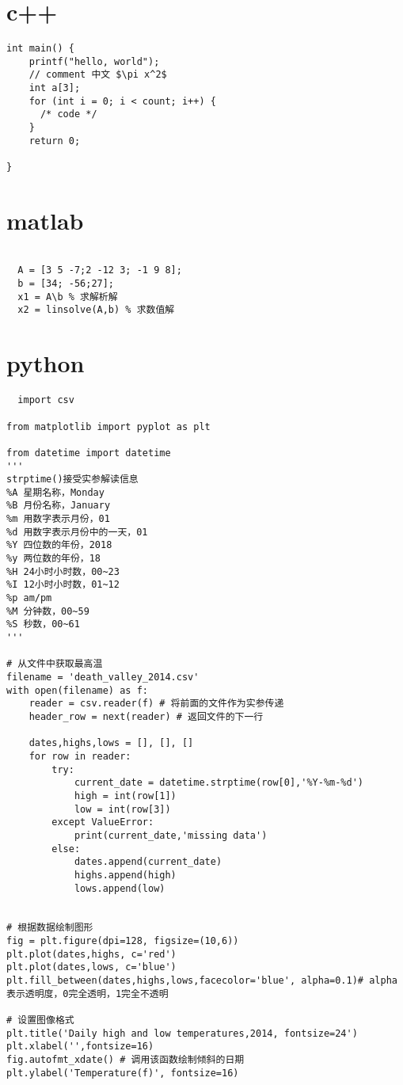\documentclass[UTF8]{ctexart}
\begin{document}
\section{c++}
\begin{verbatim}
int main() {
    printf("hello, world");
    // comment 中文 $\pi x^2$
    int a[3];
    for (int i = 0; i < count; i++) {
      /* code */
    }
    return 0;

}
\end{verbatim}

\section{matlab}
\begin{verbatim}

  A = [3 5 -7;2 -12 3; -1 9 8];
  b = [34; -56;27];
  x1 = A\b % 求解析解
  x2 = linsolve(A,b) % 求数值解
\end{verbatim}




\section{python}

\begin{verbatim}
  import csv

from matplotlib import pyplot as plt

from datetime import datetime
'''
strptime()接受实参解读信息
%A 星期名称，Monday
%B 月份名称，January
%m 用数字表示月份，01
%d 用数字表示月份中的一天，01
%Y 四位数的年份，2018
%y 两位数的年份，18
%H 24小时小时数，00~23
%I 12小时小时数，01~12
%p am/pm
%M 分钟数，00~59
%S 秒数，00~61
'''

# 从文件中获取最高温
filename = 'death_valley_2014.csv'
with open(filename) as f:
    reader = csv.reader(f) # 将前面的文件作为实参传递
    header_row = next(reader) # 返回文件的下一行

    dates,highs,lows = [], [], []
    for row in reader:
        try:
            current_date = datetime.strptime(row[0],'%Y-%m-%d')
            high = int(row[1])
            low = int(row[3])
        except ValueError:
            print(current_date,'missing data')
        else:
            dates.append(current_date)
            highs.append(high)
            lows.append(low)


# 根据数据绘制图形
fig = plt.figure(dpi=128, figsize=(10,6))
plt.plot(dates,highs, c='red')
plt.plot(dates,lows, c='blue')
plt.fill_between(dates,highs,lows,facecolor='blue', alpha=0.1)# alpha表示透明度，0完全透明，1完全不透明

# 设置图像格式
plt.title('Daily high and low temperatures,2014, fontsize=24')
plt.xlabel('',fontsize=16)
fig.autofmt_xdate() # 调用该函数绘制倾斜的日期
plt.ylabel('Temperature(f)', fontsize=16)
\end{verbatim}
\end{document}
